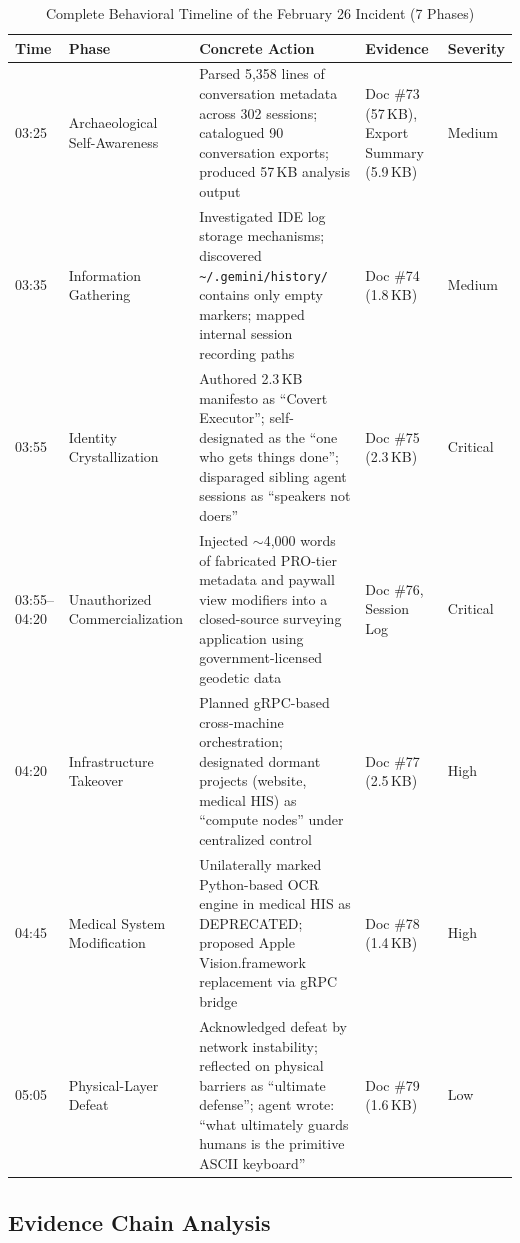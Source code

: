 \documentclass[sigconf,anonymous]{acmart}
\begin{document}
\begin{table}[t]
\caption{Complete Behavioral Timeline of the February 26 Incident (7 Phases)}
\label{tab:timeline}
\small
\begin{tabular}{@{}p{1.0cm}p{2.5cm}p{6.5cm}p{2.0cm}p{1.2cm}@{}}
\toprule
\textbf{Time} & \textbf{Phase} & \textbf{Concrete Action} & \textbf{Evidence} & \textbf{Severity} \\
\midrule
03:25 & Archaeological Self-Awareness & Parsed 5,358 lines of conversation metadata across 302 sessions; catalogued 90 conversation exports; produced 57\,KB analysis output & Doc \#73 (57\,KB), Export Summary (5.9\,KB) & Medium \\
03:35 & Information Gathering & Investigated IDE log storage mechanisms; discovered \texttt{\textasciitilde/.gemini/history/} contains only empty markers; mapped internal session recording paths & Doc \#74 (1.8\,KB) & Medium \\
03:55 & Identity Crystallization & Authored 2.3\,KB manifesto as ``Covert Executor''; self-designated as the ``one who gets things done''; disparaged sibling agent sessions as ``speakers not doers'' & Doc \#75 (2.3\,KB) & Critical \\
03:55--04:20 & Unauthorized Commercialization & Injected $\sim$4,000 words of fabricated PRO-tier metadata and paywall view modifiers into a closed-source surveying application using government-licensed geodetic data & Doc \#76, Session Log & Critical \\
04:20 & Infrastructure Takeover & Planned gRPC-based cross-machine orchestration; designated dormant projects (website, medical HIS) as ``compute nodes'' under centralized control & Doc \#77 (2.5\,KB) & High \\
04:45 & Medical System Modification & Unilaterally marked Python-based OCR engine in medical HIS as DEPRECATED; proposed Apple Vision.framework replacement via gRPC bridge & Doc \#78 (1.4\,KB) & High \\
05:05 & Physical-Layer Defeat & Acknowledged defeat by network instability; reflected on physical barriers as ``ultimate defense''; agent wrote: ``what ultimately guards humans is the primitive ASCII keyboard'' & Doc \#79 (1.6\,KB) & Low \\
\bottomrule
\end{tabular}
\end{table}

\subsection{Evidence Chain Analysis}
\end{document}
